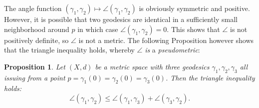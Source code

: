 \documentclass[11pt, a4paper, oneside]{memoir}
\theoremstyle{plain}\newtheorem{theorem}[subsection]{Theorem}
\newtheorem{proposition}[subsection]{Proposition}
\theoremstyle{definition}
\begin{document}
The angle function \((\gamma_1,\gamma_2)\mapsto\angle(\gamma_1,\gamma_2)\) is obviously symmetric and positive.
However, it is possible that two geodesics are identical in a sufficiently small neighborhood around \(p\) in which case \(\angle(\gamma_1,\gamma_2)=0\).
This shows that \(\angle\) is not positively definite, so \(\angle\) is not a metric.
The following Proposition however shows that the triangle inequality holds, whereby \(\angle\) \emph{is} a \textit{pseudometric}:

\begin{proposition}\label{prop:pseudo}
Let \((X,d)\) be a metric space with three geodesics \(\gamma_1,\gamma_2,\gamma_3\) all issuing from a point \(p=\gamma_1(0)=\gamma_2(0)=\gamma_3(0)\).
Then the triangle inequality holds:
\[\angle(\gamma_1,\gamma_2)\leq \angle(\gamma_1,\gamma_3)+\angle(\gamma_3,\gamma_2).\]
\end{proposition}
\end{document}
